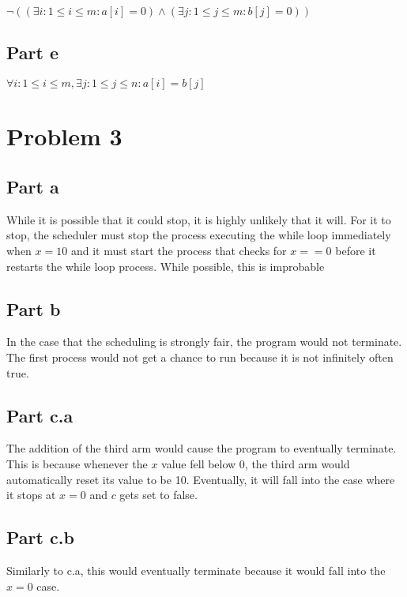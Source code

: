 \documentclass{article}%
\begin{document}
$\neg((\exists i : 1 \leq i \leq m : a[i] = 0) \wedge (\exists j : 1 \leq j \leq m : b[j] = 0))$

\subsection{Part e}

$\forall i : 1 \leq i \leq m, \exists j : 1 \leq j \leq n : a[i] = b[j]$

\section{Problem 3}

\subsection{Part a}

While it is possible that it could stop, it is highly unlikely that it will. For it to stop, the scheduler must stop the process executing the while loop immediately when $x=10$ and it must start the process that checks for $x==0$ before it restarts the while loop process. While possible, this is improbable

\subsection{Part b}

In the case that the scheduling is strongly fair, the program would not terminate. The first process would not get a chance to run because it is not infinitely often true.

\subsection{Part c.a}
The addition of the third arm would cause the program to eventually terminate. This is because whenever the $x$ value fell below 0, the third arm would automatically reset its value to be 10. Eventually, it will fall into the case where it stops at $x=0$ and $c$ gets set to false.

\subsection{Part c.b}

Similarly to c.a, this would eventually terminate because it would fall into the $x=0$ case.
\end{document}

